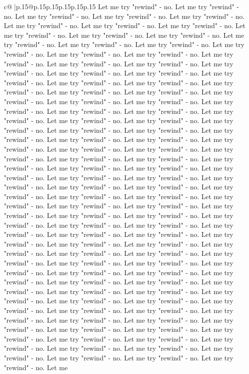 \documentclass{article}
\begin{document}
{\begin{supertabular}{c@{$\;$}|p{.15\linewidth}@{}p{.15\linewidth}p{.15\linewidth}p{.15\linewidth}p{.15\linewidth}p{.15\linewidth}}
{{{Let me try "rewind" {-} no. Let me try "rewind" {-} no. Let me try "rewind" {-} no. Let me try "rewind" {-} no. Let me try "rewind" {-} no. Let me try "rewind" {-} no. Let me try "rewind" {-} no. Let me try "rewind" {-} no. Let me try "rewind" {-} no. Let me try "rewind" {-} no. Let me try "rewind" {-} no. Let me try "rewind" {-} no. Let me try "rewind" {-} no. Let me try "rewind" {-} no. Let me try "rewind" {-} no. Let me try "rewind" {-} no. Let me try "rewind" {-} no. Let me try "rewind" {-} no. Let me try "rewind" {-} no. Let me try "rewind" {-} no. Let me try "rewind" {-} no. Let me try "rewind" {-} no. Let me try "rewind" {-} no. Let me try "rewind" {-} no. Let me try "rewind" {-} no. Let me try "rewind" {-} no. Let me try "rewind" {-} no. Let me try "rewind" {-} no. Let me try "rewind" {-} no. Let me try "rewind" {-} no. Let me try "rewind" {-} no. Let me try "rewind" {-} no. Let me try "rewind" {-} no. Let me try "rewind" {-} no. Let me try "rewind" {-} no. Let me try "rewind" {-} no. Let me try "rewind" {-} no. Let me try "rewind" {-} no. Let me try "rewind" {-} no. Let me try "rewind" {-} no. Let me try "rewind" {-} no. Let me try "rewind" {-} no. Let me try "rewind" {-} no. Let me try "rewind" {-} no. Let me try "rewind" {-} no. Let me try "rewind" {-} no. Let me try "rewind" {-} no. Let me try "rewind" {-} no. Let me try "rewind" {-} no. Let me try "rewind" {-} no. Let me try "rewind" {-} no. Let me try "rewind" {-} no. Let me try "rewind" {-} no. Let me try "rewind" {-} no. Let me try "rewind" {-} no. Let me try "rewind" {-} no. Let me try "rewind" {-} no. Let me try "rewind" {-} no. Let me try "rewind" {-} no. Let me try "rewind" {-} no. Let me try "rewind" {-} no. Let me try "rewind" {-} no. Let me try "rewind" {-} no. Let me try "rewind" {-} no. Let me try "rewind" {-} no. Let me try "rewind" {-} no. Let me try "rewind" {-} no. Let me try "rewind" {-} no. Let me try "rewind" {-} no. Let me try "rewind" {-} no. Let me try "rewind" {-} no. Let me try "rewind" {-} no. Let me try "rewind" {-} no. Let me try "rewind" {-} no. Let me try "rewind" {-} no. Let me try "rewind" {-} no. Let me try "rewind" {-} no. Let me try "rewind" {-} no. Let me try "rewind" {-} no. Let me try "rewind" {-} no. Let me try "rewind" {-} no. Let me try "rewind" {-} no. Let me try "rewind" {-} no. Let me try "rewind" {-} no. Let me try "rewind" {-} no. Let me try "rewind" {-} no. Let me try "rewind" {-} no. Let me try "rewind" {-} no. Let me try "rewind" {-} no. Let me try "rewind" {-} no. Let me try "rewind" {-} no. Let me try "rewind" {-} no. Let me try "rewind" {-} no. Let me try "rewind" {-} no. Let me try "rewind" {-} no. Let me try "rewind" {-} no. Let me try "rewind" {-} no. Let me try "rewind" {-} no. Let me try "rewind" {-} no. Let me try "rewind" {-} no. Let me try "rewind" {-} no. Let me try "rewind" {-} no. Let me try "rewind" {-} no. Let me try "rewind" {-} no. Let me try "rewind" {-} no. Let me try "rewind" {-} no. Let me try "rewind" {-} no. Let me try "rewind" {-} no. Let me try "rewind" {-} no. Let me try "rewind" {-} no. Let me try "rewind" {-} no. Let me try "rewind" {-} no. Let me try "rewind" {-} no. Let me try "rewind" {-} no. Let me }}}
\end{supertabular}}
\end{document}
